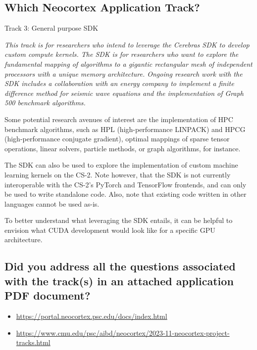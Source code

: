 \subsection{Which Neocortex Application Track?}

Track 3: General purpose SDK

\begin{displayquote} \itshape
This track is for researchers who intend to leverage the Cerebras SDK to develop custom compute kernels.
The SDK is for researchers who want to explore the fundamental mapping of algorithms to a gigantic rectangular mesh of independent processors with a unique memory architecture.
Ongoing research work with the SDK includes a collaboration with an energy company to implement a finite difference method for seismic wave equations and the implementation of Graph 500 benchmark algorithms.

Some potential research avenues of interest are the implementation of HPC benchmark algorithms, such as HPL (high-performance LINPACK) and HPCG (high-performance conjugate gradient), optimal mappings of sparse tensor operations, linear solvers, particle methods, or graph algorithms, for instance.

The SDK can also be used to explore the implementation of custom machine learning kernels on the CS-2.
Note however, that the SDK is not currently interoperable with the CS-2's PyTorch and TensorFlow frontends, and can only be used to write standalone code.
Also, note that existing code written in other languages cannot be used as-is.

To better understand what leveraging the SDK entails, it can be helpful to envision what CUDA development would look like for a specific GPU architecture.
\end{displayquote}

\subsection{Did you address all the questions associated with the track(s) in an attached application PDF document?}

\begin{displayquote} \itshape
    \begin{itemize}
    \item \url{https://portal.neocortex.psc.edu/docs/index.html}
    \item \url{https://www.cmu.edu/psc/aibd/neocortex/2023-11-neocortex-project-tracks.html}
    \end{itemize}
\end{displayquote}

